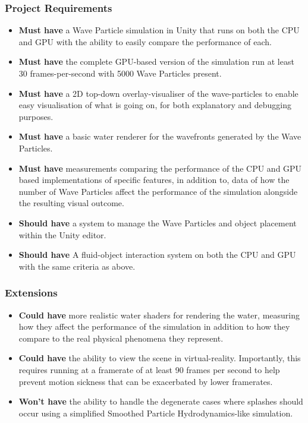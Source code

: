\documentclass[12pt,a4paper,twoside]{report}
\begin{document}
\subsubsection{Project Requirements}

\begin{itemize}

\item \textbf{Must have} a Wave Particle simulation in Unity that runs on both
the CPU and GPU with the ability to easily compare the performance of each.

\item \textbf{Must have} the complete GPU-based version of the simulation run
at least 30 frames-per-second with 5000 Wave Particles present.

\item \textbf{Must have} a 2D top-down overlay-visualiser of the wave-particles
to enable easy visualisation of what is going on, for both explanatory and
debugging purposes.

\item \textbf{Must have} a basic water renderer for the wavefronts generated by
the Wave Particles.

\item \textbf{Must have} measurements comparing the performance of the CPU and
GPU based implementations of specific features, in addition to, data of how the
number of Wave Particles affect the performance of the simulation alongside the
resulting visual outcome.

\item \textbf{Should have} a system to manage the Wave Particles and object
placement within the Unity editor.

\item \textbf{Should have} A fluid-object interaction system on both the CPU
and GPU with the same criteria as above.

\end{itemize}

\subsubsection{Extensions}

\begin{itemize}

\item \textbf{Could have} more realistic water shaders for rendering the water,
measuring how they affect the performance of the simulation in addition to how
they compare to the real physical phenomena they represent.

\item \textbf{Could have} the ability to view the scene in virtual-reality.
Importantly, this requires running at a framerate of at least 90 frames per
second to help prevent motion sickness that can be exacerbated by lower
framerates.

\item \textbf{Won't have} the ability to handle the degenerate cases where
splashes should occur using a simplified Smoothed Particle Hydrodynamics-like
simulation.

\end{itemize}
\end{document}
